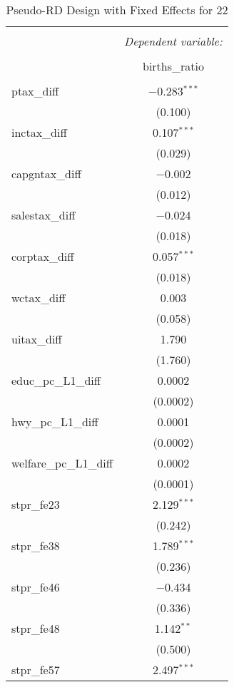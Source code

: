 
\begin{table}[!htbp] \centering 
  \caption{Pseudo-RD Design with Fixed Effects for  22} 
  \label{} 
\begin{tabular}{@{\extracolsep{5pt}}lc} 
\\[-1.8ex]\hline 
\hline \\[-1.8ex] 
 & \multicolumn{1}{c}{\textit{Dependent variable:}} \\ 
\cline{2-2} 
\\[-1.8ex] & births\_ratio \\ 
\hline \\[-1.8ex] 
 ptax\_diff & $-$0.283$^{***}$ \\ 
  & (0.100) \\ 
  inctax\_diff & 0.107$^{***}$ \\ 
  & (0.029) \\ 
  capgntax\_diff & $-$0.002 \\ 
  & (0.012) \\ 
  salestax\_diff & $-$0.024 \\ 
  & (0.018) \\ 
  corptax\_diff & 0.057$^{***}$ \\ 
  & (0.018) \\ 
  wctax\_diff & 0.003 \\ 
  & (0.058) \\ 
  uitax\_diff & 1.790 \\ 
  & (1.760) \\ 
  educ\_pc\_L1\_diff & 0.0002 \\ 
  & (0.0002) \\ 
  hwy\_pc\_L1\_diff & 0.0001 \\ 
  & (0.0002) \\ 
  welfare\_pc\_L1\_diff & 0.0002 \\ 
  & (0.0001) \\ 
  stpr\_fe23 & 2.129$^{***}$ \\ 
  & (0.242) \\ 
  stpr\_fe38 & 1.789$^{***}$ \\ 
  & (0.236) \\ 
  stpr\_fe46 & $-$0.434 \\ 
  & (0.336) \\ 
  stpr\_fe48 & 1.142$^{**}$ \\ 
  & (0.500) \\ 
  stpr\_fe57 & 2.497$^{***}$ \\ 

\end{tabular}
\end{table}
